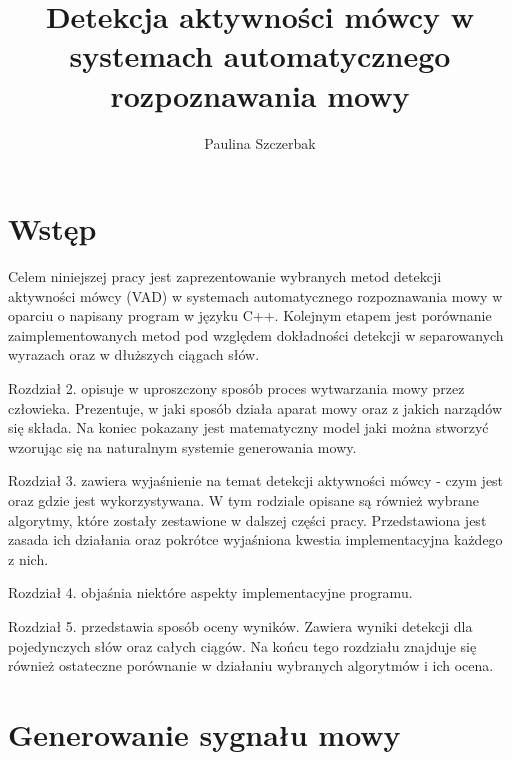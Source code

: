 \documentclass[eng,printmode]{mgr}
\title{Detekcja aktywności mówcy w systemach automatycznego rozpoznawania mowy}
\author{Paulina Szczerbak}
\begin{document}

\maketitle %

\tableofcontents %

\chapter{Wstęp}
Celem niniejszej pracy jest zaprezentowanie wybranych metod detekcji aktywności mówcy (VAD) w systemach automatycznego rozpoznawania mowy w oparciu o napisany program w języku C++. Kolejnym etapem jest porównanie zaimplementowanych metod pod względem dokładności detekcji w separowanych wyrazach oraz w dłuższych ciągach słów.\vspace{3mm}

Rozdział 2. opisuje w uproszczony sposób proces wytwarzania mowy przez człowieka. Prezentuje, w jaki sposób działa aparat mowy oraz z jakich narządów się składa. Na koniec pokazany jest matematyczny model jaki można stworzyć wzorując się na naturalnym systemie generowania mowy.\vspace{3mm}

Rozdział 3. zawiera wyjaśnienie na temat detekcji aktywności mówcy - czym jest oraz gdzie jest wykorzystywana. W tym rodziale opisane są również wybrane algorytmy, które zostały zestawione w dalszej części pracy. Przedstawiona jest zasada ich działania oraz pokrótce wyjaśniona kwestia implementacyjna każdego z nich.\vspace{3mm}
 
Rozdział 4. objaśnia niektóre aspekty implementacyjne programu.\vspace{3mm}

Rozdział 5. przedstawia sposób oceny wyników. Zawiera  wyniki detekcji dla pojedynczych słów oraz całych ciągów. Na końcu tego rozdziału znajduje się również ostateczne porównanie w działaniu wybranych algorytmów i ich ocena.\vspace{3mm}

\chapter{Generowanie sygnału mowy}
\end{document}
